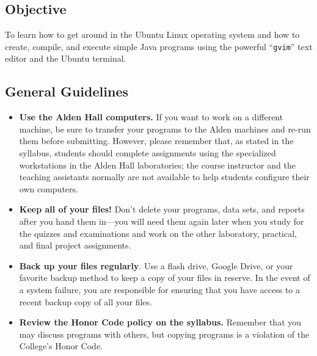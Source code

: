 


\subsection*{Objective}

To learn how to get around in the Ubuntu Linux operating system and how to create, compile, and execute simple Java
programs using the powerful ``{\tt gvim}'' text editor and the Ubuntu terminal.

\vspace*{-.1in}
\subsection*{General Guidelines}

\begin{itemize}
  \setlength{\itemsep}{0pt}

  \item {\bf Use the Alden Hall computers.} If you want to work on a different machine, be sure to transfer your
    programs to the Alden machines and re-run them before submitting. However, please remember that, as stated in the
    syllabus, students should complete assignments using the specialized workstations in the Alden Hall laboratories;
    the course instructor and the teaching assistants normally are not available to help students configure their own
    computers.

  \item {\bf Keep all of your files!} Don't delete your programs, data sets, and reports after you hand them in---you
    will need them again later when you study for the quizzes and examinations and work on the other laboratory,
    practical, and final project assignments.

  \item {\bf Back up your files regularly}. Use a flash drive, Google Drive, or your favorite backup method to keep a
    copy of your files in reserve. In the event of a system failure, you are responsible for ensuring that you have
    access to a recent backup copy of all your files.

  \item {\bf Review the Honor Code policy on the syllabus.} Remember that you may discuss programs with others, but
    copying programs is a violation of the College's Honor Code.

\end{itemize}

